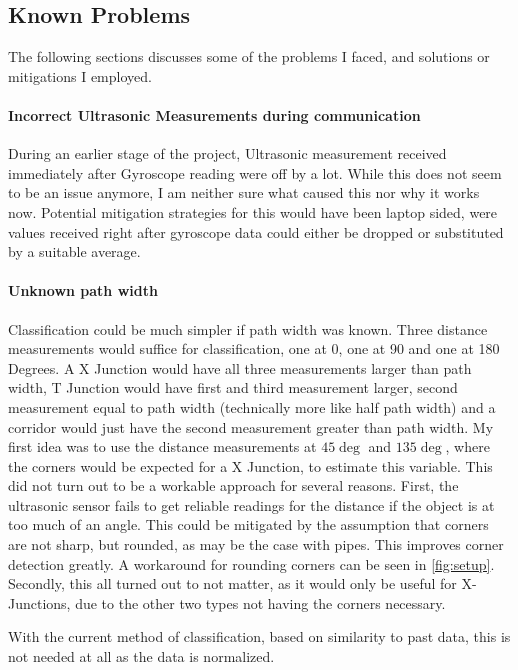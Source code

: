 \subsection{Known Problems}

The following sections discusses some of the problems I faced, and solutions or mitigations I employed.

\paragraph{Incorrect Ultrasonic Measurements during \IIC communication}
During an earlier stage of the project, Ultrasonic measurement received immediately after Gyroscope reading were off
by a lot.
While this does not seem to be an issue anymore, I am neither sure what caused this nor why it works now.
Potential mitigation strategies for this would have been laptop sided, were values received right after gyroscope data
could either be dropped or substituted by a suitable average.


\paragraph{Unknown path width}
Classification could be much simpler if path width was known. Three distance measurements would suffice for classification, one at 0, one at 90 and one at 180 Degrees.
A X Junction would have all three measurements larger than path width,
T Junction would have first and third measurement larger, second measurement equal to path width (technically more like half path width) and
a corridor would just have the second measurement greater than path width.
My first idea was to use the distance measurements at $45\deg$ and $135\deg$, where the corners would be expected for a X Junction, to estimate this variable.
This did not turn out to be a workable approach for several reasons.
First, the ultrasonic sensor fails to get reliable readings for the distance if the object is at too much of an angle. This could be mitigated by the assumption that corners are not sharp, but rounded, as may be the case with pipes. This improves corner detection greatly. A workaround for rounding corners can be seen in \ref{fig:setup}.
Secondly, this all turned out to not matter, as it would only be useful for X-Junctions, due to the other two types not having the corners necessary.

With the current method of classification, based on similarity to past data, this is not needed at all as the data is normalized.

